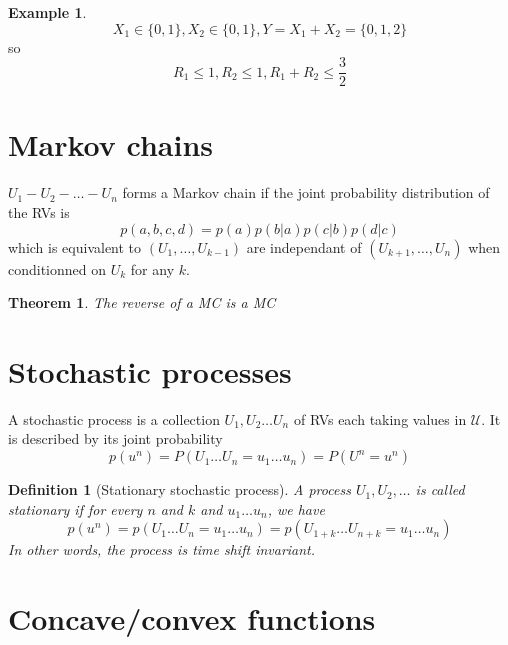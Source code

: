 \documentclass[twoside]{article}
\newtheorem{theorem}{Theorem}[section]
\newtheorem{definition}{Definition}[section]
\theoremstyle{definition} %
\newtheorem{example}{Example}
\def\U{\mathcal{U}}
\begin{document}
\begin{example}
  \[
    X_1 \in \{0, 1\}, X_2 \in \{0, 1\}, Y = X_1 + X_2 = \{0, 1, 2\}
  \]
  so
  \[
    R_1 \leq 1, R_2 \leq 1, R_1 + R_2 \leq \frac{3}{2}
  \]
\end{example}









\cleardoublepage
\begin{appendices}
\section{Markov chains}
\label{appendix:markov-chains}

$U_1 - U_2 - \dots - U_n$ forms a Markov chain if the joint probability
distribution of the RVs is
\[
  p(a,b,c,d) = p(a)p(b|a)p(c|b)p(d|c)
\]
which is equivalent to $(U_1, \dots, U_{k-1})$ are independant of $(U_{k+1}, \dots, U_n)$ when conditionned on $U_k$ for any $k$.


\begin{theorem}
  The reverse of a MC is a MC
\end{theorem}


\section{Stochastic processes}
\label{appendix:stoch-proc}

A stochastic process is a collection $U_1, U_2 \dots U_n$ of RVs each taking values in $\U$. It is described by its joint probability
\[
  p(u^n) = P(U_1 \dots U_n = u_1 \dots u_n) = P(U^n = u^n)
\]

\begin{definition}[Stationary stochastic process]
  A process $U_1, U_2, \dots$ is called stationary if for every $n$ and $k$ and $u_1 \dots u_n$, we have
  \[
    p(u^n) = p(U_1 \dots U_n = u_1 \dots u_n) = p(U_{1+k} \dots U_{n+k} = u_1 \dots u_n)
  \]
  In other words, the process is time shift invariant.
\end{definition}


\section{Concave/convex functions}
\label{sec:appendix-convex}


\end{appendices}
\end{document}
